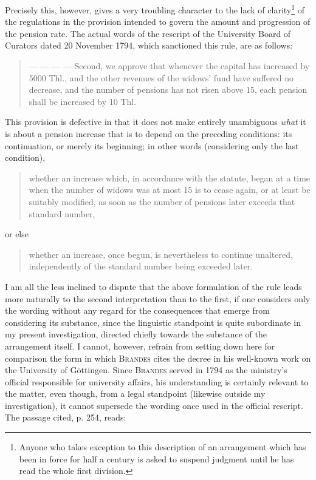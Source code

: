 \par{}
Precisely this, however, gives a very troubling character to the lack of clarity\footnote{Anyone who takes exception to this description of an arrangement which has been in force for half a century is asked to suspend judgment until he has read the whole first division.} of the regulations in the provision intended to govern the amount and progression of the pension rate. The actual words of the rescript of the University Board of Curators dated 20 November 1794, which sanctioned this rule, are as follows:
\begin{quote}
— — — — Second, we approve that whenever the capital has increased by 5000 Thl., and the other revenues of the widows' fund have suffered no decrease, and the number of pensions has not risen above 15, each pension shall be increased by 10 Thl.
\end{quote}
\noindent\hspace*{\parindent}This provision is defective in that it does not make entirely unambiguous \textit{what} it is about a pension increase that is to depend on the preceding conditions: its continuation, or merely its beginning; in other words (considering only the last condition),
\begin{quote}
whether an increase which, in accordance with the statute, began at a time when the number of widows was at most 15 is to cease again, or at least be suitably modified, as soon as the number of pensions later exceeds that standard number,
\end{quote}
or else
\begin{quote}
whether an increase, once begun, is nevertheless to continue unaltered, independently of the standard number being exceeded later.
\end{quote}
\noindent\hspace*{\parindent}I am all the less inclined to dispute that the above formulation of the rule leads more naturally to the second interpretation than to the first, if one considers only the wording without any regard for the consequences that emerge from considering its substance, since the linguistic standpoint is quite subordinate in my present investigation, directed chiefly towards the substance of the arrangement itself. I cannot, however, refrain from setting down here for comparison the form in which \textsc{Brandes} cites the decree in his well-known work on the University of Göttingen. Since \textsc{Brandes} served in 1794 as the ministry's official responsible for university affairs, his understanding is certainly relevant to the matter, even though, from a legal standpoint (likewise outside my investigation), it cannot supersede the wording once used in the official rescript. The passage cited, p. 254, reads:
